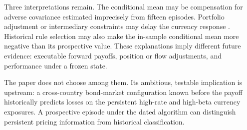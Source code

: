 Three interpretations remain. The conditional mean may be compensation for adverse covariance estimated imprecisely from fifteen episodes. Portfolio adjustment or intermediary constraints may delay the currency response \citep{bacchettaWincoop2010,gabaixMaggiori2015}. Historical rule selection may also make the in-sample conditional mean more negative than its prospective value. These explanations imply different future evidence: executable forward payoffs, position or flow adjustments, and performance under a frozen state.

The paper does not choose among them. Its ambitious, testable implication is upstream: a cross-country bond-market configuration known before the payoff historically predicts losses on the persistent high-rate and high-beta currency exposures. A prospective episode under the dated algorithm can distinguish persistent pricing information from historical classification.
